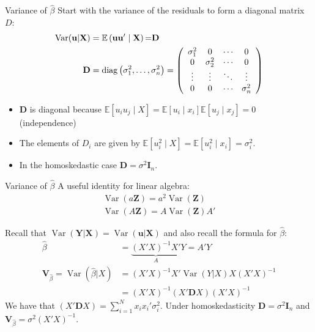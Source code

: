 \begin{frame}{Variance of $\widehat{\beta}$}
Start with the variance of the residuals to form a \alert{diagonal} matrix $D$:
\begin{align*}
\operatorname { Var } ( \mathbf{u} | \mathbf { X } ) &= \mathbb { E } \left( \mathbf{u u} ^ { \prime } \mid \mathbf { X } \right){ = } \mathbf { D }\\
\mathbf { D } &= \operatorname { diag } \left( \sigma _ { 1 } ^ { 2 } , \ldots , \sigma _ { n } ^ { 2 } \right) = \left( \begin{array} { c c c c } { \sigma _ { 1 } ^ { 2 } } & { 0 } & { \cdots } & { 0 } \\ { 0 } & { \sigma _ { 2 } ^ { 2 } } & { \cdots } & { 0 } \\ { \vdots } & { \vdots } & { \ddots } & { \vdots } \\ { 0 } & { 0 } & { \cdots } & { \sigma _ { n } ^ { 2 } } \end{array} \right)
\end{align*}
\begin{itemize}
\item $\mathbf{D}$ is diagonal because $\mathbb { E }[u_i u_j \mid  X] = \mathbb { E }[u_i  \mid x_i]  \mathbb { E }[u_j  \mid  x_j]=0$ (independence)
\item The elements of $D_i$ are given by $\mathbb { E }[u_i^2 \mid  X] = \mathbb { E }[u_i^2 \mid x_i] = \sigma_i^2$.
\item In the \alert{homoskedastic} case $\mathbf{D} = \sigma^2 \mathbf{I}_n$.
\end{itemize}
\end{frame}

\begin{frame}{Variance of $\widehat{\beta}$}
A useful identity for linear algebra:
\begin{align*}
\operatorname { Var } (a \mathbf{Z} ) = a^2 \operatorname { Var }(\mathbf{Z})\\
\operatorname { Var } (A \mathbf{Z} ) = A \operatorname { Var }(\mathbf{Z}) A'
\end{align*}

Recall that $\operatorname { Var } ( \mathbf{Y} |\mathbf{X} )  = \operatorname { Var } ( \mathbf{u} | \mathbf { X } ) $ and also
recall the formula for $\widehat{\beta}$:
\begin{align*}
\widehat{\beta} &= \underbrace{(X'X)^{-1} X' }_{A} Y= A' Y \\
\mathbf{V}_{\widehat{\beta}} = \operatorname { Var }(\widehat{\beta} | X)&= (X'X)^{-1} X'  \operatorname { Var }(Y| X) X (X'X)^{-1} \\
													     &= (X'X)^{-1} (X'  \mathbf{D} X) (X'X)^{-1} 
\end{align*}
We have that $ (X'  \mathbf{D} X)  = \sum_{i=1}^N x_i x_i'\sigma_i^2$. Under homoskedasticity $\mathbf{D} = \sigma^2 \mathbf{I}_n$ and $\mathbf{V}_{\widehat{\beta}} = \sigma^2 (X'X)^{-1}$.
\end{frame}


